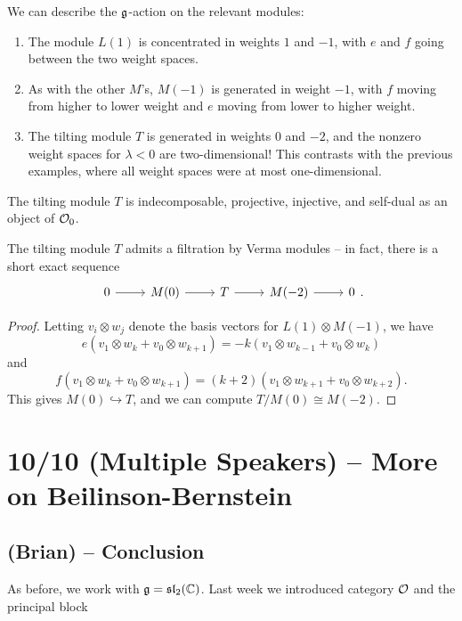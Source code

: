 \documentclass{article}
\begin{document}
\begin{ex}
	We can describe the $\mathfrak{g}$-action on the relevant modules:
	\begin{enumerate}
		\item The module $L(1)$ is concentrated in weights $1$ and $-1$, with $e$ and $f$ going between the two weight spaces.
		\item As with the other $M$'s, $M(-1)$ is generated in weight $-1$, with $f$ moving from higher to lower weight and $e$ moving from lower to higher weight.
		\item The tilting module $T$ is generated in weights $0$ and $-2$, and the nonzero weight spaces for $\lambda < 0$ are two-dimensional!
			This contrasts with the previous examples, where all weight spaces were at most one-dimensional.
	\end{enumerate}
\end{ex}

\begin{prop}
	The tilting module $T$ is indecomposable, projective, injective, and self-dual as an object of $\mathcal{O}_0$.
\end{prop}

\begin{prop}
	The tilting module $T$ admits a filtration by Verma modules -- in fact, there is a short exact sequence
	\[
		\SES{M(0)}{T}{M(-2)}.
	\]
\end{prop}

\begin{proof}
	Letting $v_i \otimes w_j$ denote the basis vectors for $L(1) \otimes M(-1)$, we have
	\[
		e(v_1 \otimes w_k + v_0 \otimes w_{k+1}) = -k (v_1 \otimes w_{k-1} + v_0 \otimes w_k)
	\]
	and
	\[
		f(v_1 \otimes w_k + v_0 \otimes w_{k+1}) = (k+2) (v_1 \otimes w_{k+1} + v_0 \otimes w_{k+2}).
	\]
	This gives $M(0) \hookrightarrow T$, and we can compute $T / M(0) \cong M(-2)$.
\end{proof}

\section{10/10 (Multiple Speakers) -- More on Beilinson-Bernstein} 

\subsection{(Brian) -- Conclusion}

As before, we work with $\mathfrak{g} = \mathfrak{sl}_2(\mathbb{C})$.
Last week we introduced category $\mathcal{O}$ and the principal block 
\end{document}

